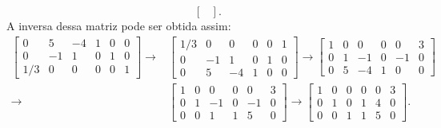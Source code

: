 \documentclass[12pt,a4paper]{article}
\begin{document}
\begin{ExerciseList}
\begin{enumerate}
\[\begin{bmatrix}
\end{bmatrix}.
\]
A inversa dessa matriz pode ser obtida assim:
\begin{align*}
\begin{bmatrix}
  0 &  5 & -4 & 1 & 0 & 0 \\
  0 & -1 &  1 & 0 & 1 & 0 \\
1/3 &  0 &  0 & 0 & 0 & 1
\end{bmatrix}
\rightarrow
& \begin{bmatrix}
1/3 &  0 &  0 & 0 & 0 & 1 \\
  0 & -1 &  1 & 0 & 1 & 0 \\
  0 &  5 & -4 & 1 & 0 & 0
\end{bmatrix}
\rightarrow
\begin{bmatrix}
1 & 0 &  0 & 0 &  0 & 3 \\
0 & 1 & -1 & 0 & -1 & 0 \\
0 & 5 & -4 & 1 &  0 & 0
\end{bmatrix} \\
\rightarrow
& \begin{bmatrix}
1 & 0 &  0 & 0 &  0 & 3 \\
0 & 1 & -1 & 0 & -1 & 0 \\
0 & 0 &  1 & 1 &  5 & 0
\end{bmatrix}
\rightarrow
\begin{bmatrix}
1 & 0 & 0 & 0 & 0 & 3 \\
0 & 1 & 0 & 1 & 4 & 0 \\
0 & 0 & 1 & 1 & 5 & 0
\end{bmatrix}.
\end{align*}


\end{enumerate}
\end{ExerciseList}
\end{document}
